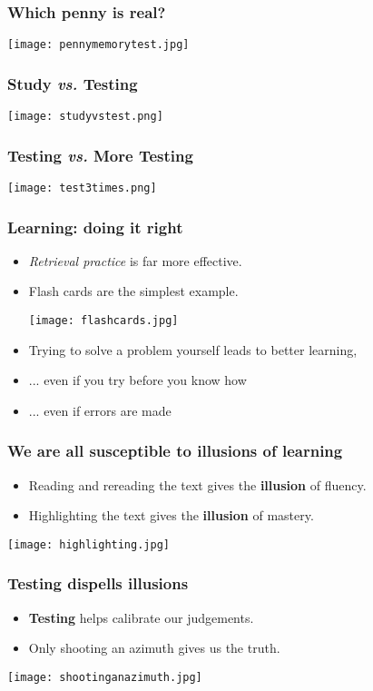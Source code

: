 \documentclass{beamer}
\newcommand{\bi}{\begin{itemize}}
\newcommand{\li}{\item}
\newcommand{\ei}{\end{itemize}}
\newcommand{\bfr}[1]{\begin{frame}[fragile]\frametitle{{ #1 }}}
\begin{document}
\bfr{Which penny is real?}
\texttt{[image: pennymemorytest.jpg]}
\end{frame}

\bfr{Study {\em vs.} Testing}
\texttt{[image: studyvstest.png]}
\end{frame}

\bfr{Testing {\em vs.} More Testing}
\texttt{[image: test3times.png]}
\end{frame}

\bfr{Learning: doing it right}
\bi
\li {\em Retrieval practice} is far more effective.
\li Flash cards are the simplest example.
\centerline{\texttt{[image: flashcards.jpg]}}
\li Trying to solve a problem yourself
leads to better learning,

\li ... even if you try before you know how
\li ... even if errors are made

\ei


\end{frame}



\bfr{We are all susceptible to {\bf illusions} of learning}
\bi
\li Reading and rereading 
the text gives the {\bf illusion} of fluency.
\li Highlighting 
the text gives the {\bf illusion} of mastery.
\ei
\centerline{\texttt{[image: highlighting.jpg]}}
\end{frame}

\bfr{Testing dispells illusions}
\bi
\li {\bf Testing} helps calibrate our judgements.
\li Only shooting an azimuth gives us the truth.
\ei
\centerline{\texttt{[image: shootinganazimuth.jpg]}}
\end{frame}
\end{document}
